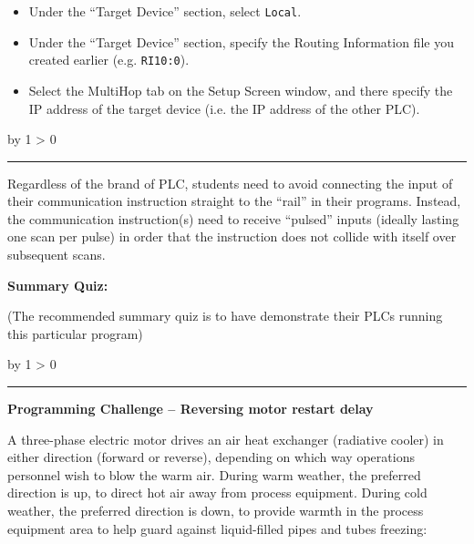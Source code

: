 \documentclass[12pt,a4paper]{article}
\def\oppgave{
            \advance\questnum by 1
            \ifnum \questnum > 0
                 \hrule
                 \vskip 3pt
                 \leftline{Oppgave \the\questnum}
                 \vskip 3pt \fi}
\def\notes{
           \advance\explnum by 1
           \ifnum \explnum > 0
                \hrule
                \vskip 3pt
                \leftline{Notes \the\explnum}
                \vskip 3pt \fi}
\begin{document}
\begin{itemize}
\vskip 5pt
\item{} Under the ``Target Device'' section, select {\tt Local}.
\vskip 5pt
\item{} Under the ``Target Device'' section, specify the Routing Information file you created earlier (e.g. {\tt RI10:0}).
\vskip 5pt
\item{} Select the MultiHop tab on the Setup Screen window, and there specify the IP address of the target device (i.e. the IP address of the other PLC).
\end{itemize}


\vskip 10pt \filbreak 





\notes{} 

Regardless of the brand of PLC, students need to avoid connecting the input of their communication instruction straight to the ``rail'' in their programs.  Instead, the communication instruction(s) need to receive ``pulsed'' inputs (ideally lasting one scan per pulse) in order that the instruction does not collide with itself over subsequent scans.




\vfil \eject

\noindent
{\bf Summary Quiz:}

(The recommended summary quiz is to have  demonstrate their PLCs running this particular program)


\vfil \eject 



\oppgave{} 

\noindent
{\bf Programming Challenge -- Reversing motor restart delay} 

\vskip 10pt

A three-phase electric motor drives an air heat exchanger (radiative cooler) in either direction (forward or reverse), depending on which way operations personnel wish to blow the warm air.  During warm weather, the preferred direction is up, to direct hot air away from process equipment.  During cold weather, the preferred direction is down, to provide warmth in the process equipment area to help guard against liquid-filled pipes and tubes freezing:
\end{document}
